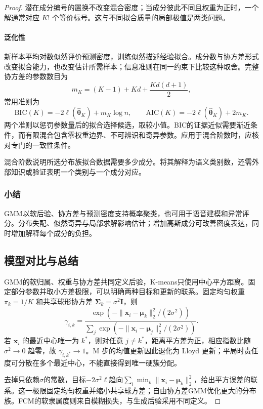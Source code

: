 \begin{proof}
潜在成分编号的置换不改变混合密度；当成分彼此不同且权重为正时，一个解通常对应 $K!$ 个等价标号。这与不同拟合质量的局部极值是两类问题。

\paragraph{泛化性}
新样本平均对数似然评价预测密度，训练似然描述经验拟合。成分数与协方差形式改变拟合能力，也改变估计所需样本；信息准则在同一约束下比较这种取舍。完整协方差的参数数目为
\[
 m_K=(K-1)+Kd+\frac{Kd(d+1)}{2},
\]
常用准则为
\begin{equation}
 \mathrm{BIC}(K)=-2\ell(\hat{\bm{\theta}}_K)+m_K\log n,
 \qquad
 \mathrm{AIC}(K)=-2\ell(\hat{\bm{\theta}}_K)+2m_K.
 \label{eq:clustering-bic}
\end{equation}
两个准则以惩罚参数量后的拟合选择候选，取较小值。BIC的证据近似需要渐近条件，而有限混合包含零权重边界、不可辨识和奇异参数。应用于混合阶数时，应核对专门的一致性条件。

混合阶数说明所选分布族拟合数据需要多少成分。将其解释为语义类别数，还需外部知识或验证表明一个类别与一个成分对应。

\subsubsection{小结}

GMM以软后验、协方差与预测密度支持概率聚类，也可用于语音建模和异常评分。分布失配、似然奇异与局部求解影响估计；增加高斯成分可改善密度表达，同时增加解释每个成分的负担。

\subsection{模型对比与总结}

GMM的软归属、权重与协方差共同定义后验，K-means只使用中心平方距离。固定部分参数并取小方差极限，可以明确两种目标和更新的联系。固定均匀权重 $\pi_k=1/K$ 和共享球形协方差 $\bm{\Sigma}_k=\sigma^2\bm{I}$，则
\[
 \gamma_{i,k}=
 \frac{\exp(-\lVert\bm{x}_i-\bm{\mu}_k\rVert_2^2/(2\sigma^2))}
 {\sum_j\exp(-\lVert\bm{x}_i-\bm{\mu}_j\rVert_2^2/(2\sigma^2))}.
\]
若 $\bm{x}_i$ 的最近中心唯一为 $k^\ast$，则对任意 $j\ne k^\ast$，距离平方差为正，相应指数比随 $\sigma^2\to0$ 趋零，故 $\gamma_{i,k^\ast}\to1$。M 步的均值更新因此退化为 Lloyd 更新；平局时责任度可分散在多个最近中心，不能直接得到唯一硬簇分配。

去掉只依赖$\sigma$的常数，目标$-2\sigma^2\ell$趋向$\sum_i\min_k\lVert\bm{x}_i-\bm{\mu}_k\rVert_2^2$，给出平方误差的联系。这一极限固定均匀权重并缩小共享球方差；自由协方差GMM优化更大的分布族。FCM的软隶属度则来自模糊损失，与生成后验采用不同定义。


\end{proof}
